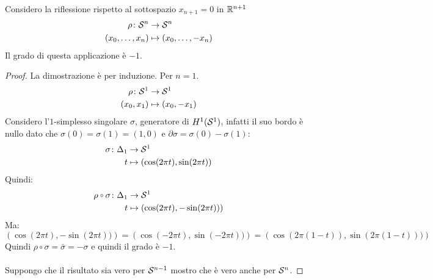 \begin{proposition}
  Considero la riflessione rispetto al sottospazio $ x_{n+1} = 0 $ in $ \mathbb{R}^{n+1} $
  \begin{align*}
    \rho \colon \mathcal{S}^{n} & \to \mathcal{S}^{n} \\
    (x_0, \dots, x_{n}) & \mapsto (x_0, \dots, - x_{n})
  \end{align*}
  Il grado di questa applicazione è $ - 1 $.
\end{proposition}
\begin{proof}
  La dimostrazione è per induzione.
  Per $ n = 1 $.
  \begin{align*}
    \rho \colon \mathcal{S}^{1} & \to \mathcal{S}^{1} \\
    (x_0,x_1) & \mapsto (x_0, -x_1)
  \end{align*}
  Considero l'$ 1 $-simplesso singolare $ \sigma $, generatore di $ H^1(\mathcal{S}^{1}) $,
  infatti il suo bordo è nullo dato che $ \sigma(0) = \sigma(1) = (1,0) $ e $ \partial \sigma = \sigma(0) - \sigma(1) $:
  \begin{align*}
    \sigma \colon \Delta_1 & \to \mathcal{S}^{1} \\
    t & \mapsto \left(\cos(2 \pi t), \sin(2 \pi t)\right)
  \end{align*}
  Quindi:
  \begin{align*}
    \rho \circ \sigma \colon \Delta_1 & \to \Sph{1} \\
    t & \mapsto \left(\cos(2 \pi t), -\sin(2 \pi t))\right)
  \end{align*}
  Ma:
  \[
    \left(\cos(2 \pi t), -\sin(2 \pi t))\right) = \left(\cos(-2 \pi t), \sin(-2 \pi t))\right) = \left(\cos(2 \pi (1-t)), \sin(2 \pi (1-t)))\right)
  \]
  Quindi $ \rho \circ \sigma = \bar{\sigma} = - \sigma $ e quindi il grado è $ - 1 $.
  \\ \\ \noindent
  Suppongo che il risultato sia vero per $ \mathcal{S}^{n-1} $ mostro che è vero anche per $ \mathcal{S}^{n} $.

\end{proof}
